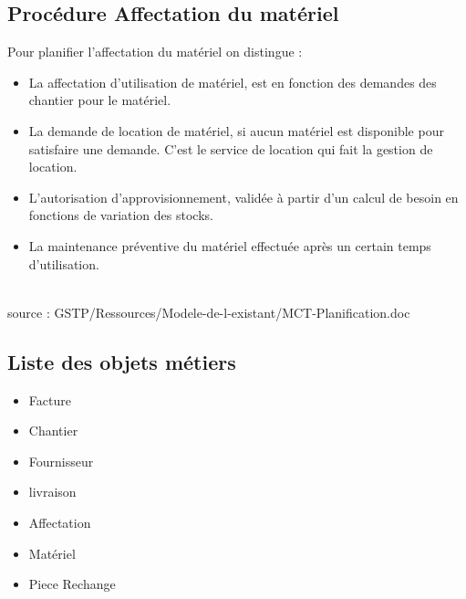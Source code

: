 \documentclass [a4paper] {report}
\begin{document}
\subsection{Procédure Affectation du matériel}

	Pour planifier l'affectation du matériel on distingue :\\
	\begin{itemize}
		\item La affectation d'utilisation de matériel, est en fonction des demandes des chantier pour le matériel.\\
		\item La demande de location de matériel, si aucun matériel est disponible pour satisfaire une demande. C'est le service de location qui fait la gestion de location.\\
		\item L'autorisation d'approvisionnement, validée à partir d'un calcul de besoin en fonctions de variation des stocks.\\
		\item La maintenance préventive du matériel effectuée après un certain temps d'utilisation.\\
	\end{itemize}
\hfill\\

source : GSTP/Ressources/Modele-de-l-existant/MCT-Planification.doc


\subsection{Liste des objets métiers}
\begin{itemize}
	\item	Facture\\
	\item Chantier\\
	\item Fournisseur\\
	\item livraison\\
	\item Affectation\\
	\item Matériel\\
	\item Piece Rechange\\
\end{itemize}
\end{document}
